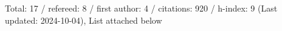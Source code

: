 Total: 17 / refereed: 8 / first author: 4 / citations: 920 / h-index: 9 (Last updated: 2024-10-04), List attached below